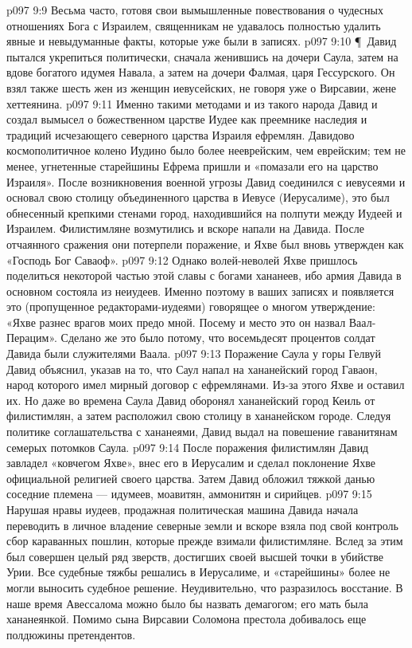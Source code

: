 \vs p097 9:9 Весьма часто, готовя свои вымышленные повествования о чудесных отношениях Бога с Израилем, священникам не удавалось полностью удалить явные и невыдуманные факты, которые уже были в записях.
\vs p097 9:10 \P\ Давид пытался укрепиться политически, сначала женившись на дочери Саула, затем на вдове богатого идумея Навала, а затем на дочери Фалмая, царя Гессурского. Он взял также шесть жен из женщин иевусейских, не говоря уже о Вирсавии, жене хеттеянина.
\vs p097 9:11 Именно такими методами и из такого народа Давид и создал вымысел о божественном царстве Иудее как преемнике наследия и традиций исчезающего северного царства Израиля ефремлян. Давидово космополитичное колено Иудино было более нееврейским, чем еврейским; тем не менее, угнетенные старейшины Ефрема пришли и «помазали его на царство Израиля». После возникновения военной угрозы Давид соединился с иевусеями и основал свою столицу объединенного царства в Иевусе (Иерусалиме), это был обнесенный крепкими стенами город, находившийся на полпути между Иудеей и Израилем. Филистимляне возмутились и вскоре напали на Давида. После отчаянного сражения они потерпели поражение, и Яхве был вновь утвержден как «Господь Бог Саваоф».
\vs p097 9:12 Однако волей\hyp{}неволей Яхве пришлось поделиться некоторой частью этой славы с богами хананеев, ибо армия Давида в основном состояла из неиудеев. Именно поэтому в ваших записях и появляется это (пропущенное редакторами\hyp{}иудеями) говорящее о многом утверждение: «Яхве разнес врагов моих предо мной. Посему и место это он назвал Ваал\hyp{}Перацим». Сделано же это было потому, что восемьдесят процентов солдат Давида были служителями Ваала.
\vs p097 9:13 Поражение Саула у горы Гелвуй Давид объяснил, указав на то, что Саул напал на хананейский город Гаваон, народ которого имел мирный договор с ефремлянами. Из\hyp{}за этого Яхве и оставил их. Но даже во времена Саула Давид оборонял хананейский город Кеиль от филистимлян, а затем расположил свою столицу в хананейском городе. Следуя политике соглашательства с хананеями, Давид выдал на повешение гаванитянам семерых потомков Саула.
\vs p097 9:14 После поражения филистимлян Давид завладел «ковчегом Яхве», внес его в Иерусалим и сделал поклонение Яхве официальной религией своего царства. Затем Давид обложил тяжкой данью соседние племена --- идумеев, моавитян, аммонитян и сирийцев.
\vs p097 9:15 Нарушая нравы иудеев, продажная политическая машина Давида начала переводить в личное владение северные земли и вскоре взяла под свой контроль сбор караванных пошлин, которые прежде взимали филистимляне. Вслед за этим был совершен целый ряд зверств, достигших своей высшей точки в убийстве Урии. Все судебные тяжбы решались в Иерусалиме, и «старейшины» более не могли выносить судебное решение. Неудивительно, что разразилось восстание. В наше время Авессалома можно было бы назвать демагогом; его мать была хананеянкой. Помимо сына Вирсавии Соломона престола добивалось еще полдюжины претендентов.
